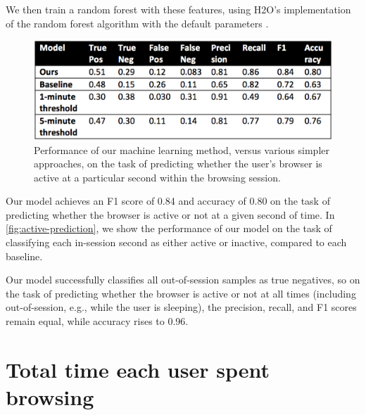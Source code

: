 \documentclass{sigchi}
\begin{document}
We then train a random forest with these features, using H2O's implementation of the random forest algorithm with the default parameters \cite{randomforest}.

\begin{figure}
    \centering
    \includegraphics[width=0.9\columnwidth]{active-prediction}
    \caption{Performance of our machine learning method, versus various simpler approaches, on the task of predicting whether the user's browser is active at a particular second within the browsing session.}
    \label{fig:active-prediction}
\end{figure}

Our model achieves an F1 score of 0.84 and accuracy of 0.80 on the task of predicting whether the browser is active or not at a given second of time. In \autoref{fig:active-prediction}, we show the performance of our model on the task of classifying each in-session second as either active or inactive, compared to each baseline.

Our model successfully classifies all out-of-session samples as true negatives, so on the task of predicting whether the browser is active or not at all times (including out-of-session, e.g., while the user is sleeping), the precision, recall, and F1 scores remain equal, while accuracy rises to 0.96.

\section{Total time each user spent browsing}
\end{document}
